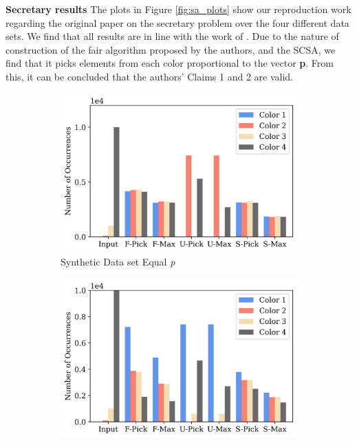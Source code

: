 \textbf{Secretary results}
\FloatBarrier
The plots in Figure \ref{fig:sa_plots} show our reproduction work regarding the original paper on the secretary problem over the four different data sets. We find that all results are in line with the work of \citep{correa2021fairness}. Due to the nature of construction of the fair algorithm proposed by the authors, and the SCSA, we find that it picks elements from each color proportional to the vector \textbf{p}. From this, it can be concluded that the authors' Claims 1 and 2 are valid.


\begin{figure}[h!]
    \centering
    \begin{subfigure}[b]{0.475\textwidth}
        \centering
        \includegraphics[width=\textwidth]{media/Images_plots/Secretaryplot_equal__ (1).png}
        \caption[Network2]%
        {{\small Synthetic Data set Equal \textit{p}}}
        \label{fig:mean and std of net14}
    \end{subfigure}
    \hfill
    \begin{subfigure}[b]{0.475\textwidth}
        \centering
        \includegraphics[width=\textwidth]{media/Images_plots/Secretaryplot_general__.png}

\end{subfigure}
\end{figure}
